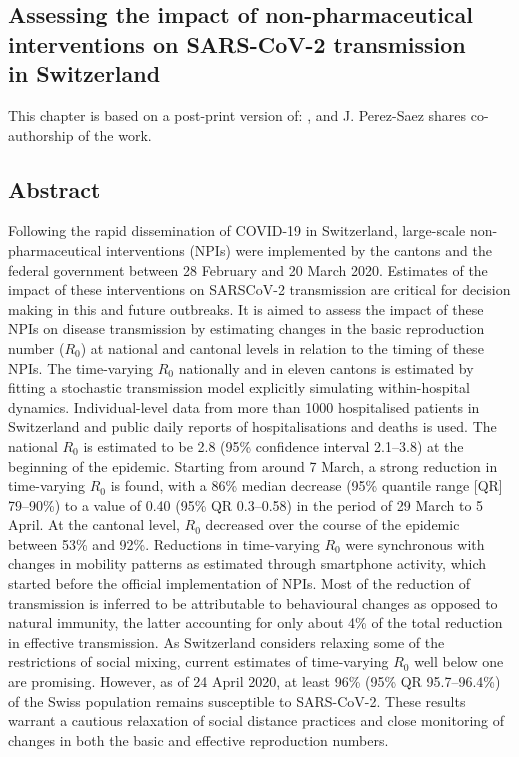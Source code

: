 \begin{fullwidth}
\chapter[Assessing the impact of non-pharmaceutical interventions on SARS-CoV-2 transmission in Switzerland]{Assessing the impact of non-pharmaceutical\\ interventions on SARS-CoV-2 transmission\\ in Switzerland}
\label{ch:covid-switzerland-npi}
This chapter is based on a post-print version of:
, and J. Perez-Saez shares co-authorship of the work.
\section{Abstract}
Following the rapid dissemination of COVID-19 in Switzerland, large-scale non-pharmaceutical interventions (NPIs) were implemented by the cantons and the federal government between 28 February and 20 March 2020. Estimates of the impact of these interventions on SARSCoV-2 transmission are critical for decision making in this and future outbreaks. It is aimed to assess the impact of these NPIs on disease transmission by estimating changes in the basic reproduction number ($R_0$) at national and cantonal levels in relation to the timing of these NPIs. The time-varying $R_0$ nationally and in eleven cantons is estimated by fitting a stochastic transmission model explicitly simulating within-hospital dynamics. Individual-level data from more than 1000 hospitalised patients in Switzerland and public daily reports of hospitalisations and deaths is used. The national $R_0$ is estimated to be 2.8 (95\% confidence interval 2.1–3.8) at the beginning of the epidemic. Starting from around 7 March, a strong reduction in time-varying $R_0$ is found, with a 86\% median decrease (95\% quantile range [QR] 79–90\%) to a value of 0.40 (95\% QR 0.3–0.58) in the period of 29 March to 5 April. At the cantonal level, $R_0$ decreased over the course of the epidemic between 53\% and 92\%. Reductions in time-varying $R_0$ were synchronous with changes in mobility patterns as estimated through smartphone activity, which started before the official implementation of NPIs. Most of the reduction of transmission is inferred to be attributable to behavioural changes as opposed to natural immunity, the latter accounting for only about 4\% of the total reduction in effective transmission. As Switzerland considers relaxing some of the restrictions of social mixing, current estimates of time-varying $R_0$ well below one are promising. However, as of 24 April 2020, at least 96\% (95\% QR 95.7–96.4\%) of the Swiss population remains susceptible to SARS-CoV-2. These results warrant a cautious relaxation of social distance practices and close monitoring of changes in both the basic and effective reproduction numbers.
\end{fullwidth}

